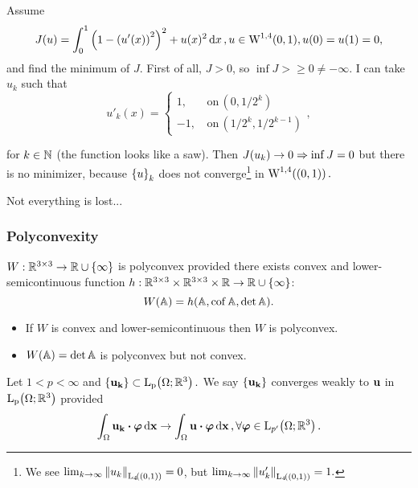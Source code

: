 \documentclass[11pt]{scrartcl} %
\begin{document}
\begin{example}
Assume
\[
	J(u) = \int_{0}^1 \qty(1-\qty(u'(x))^{2})^{2}+u(x)^{2}\dd{x}, u \in \text{W}^{1,4}(0,1), u(0) = u(1) = 0,
\]
and find the minimum of $J$. First of all, $J>0$, so $\inf J > \geq 0 \neq - \infty.$  I can take $u_k$ such that
\[
	u'_k(x) = \begin{cases} 1 , &\, \text{on} \,(0,1/2^k) \\
	-1,& \, \text{on} \, (1/2^k,1/2^{k-1})\end{cases},
\]

for $k \in {\mathbb N}$ (the function looks like a saw). Then $J\qty(u_k)\to 0 \Rightarrow \inf J = 0$ but there is no minimizer, because $\qty{u}_k$ does not converge\footnote{We see $\lim_{k \to \infty}\norm{u_k}_{\LpSet[4]{(0,1)}} = 0$, but $\lim_{k \to \infty} \norm{u'_k}_{\LpSet[4]{\qty(0,1)}} =1.$} in $\WkpSet[1][4]{\qty(0,1)}.$ 
\end{example}

Not everything is lost...

\subsubsection{Polyconvexity}
\label{sec:polyconvexity}

\begin{definition}
	$W: {\mathbb R}^{3 \times 3}\to {\mathbb R} \cup \{\infty\}$ is polyconvex provided there exists convex and lower-semicontinuous function $h: {\mathbb R}^{3 \times 3} \times {\mathbb R}^{3 \times 3} \times {\mathbb R} \to {\mathbb R} \cup \{\infty\}$:
\[
	W\qty(\mathbb{A})=h\qty(\mathbb{A}, \operatorname{cof} \mathbb{A}, \det \mathbb{A}).
\]
\end{definition}

\begin{example}
	\begin{itemize}
		\item	If $W$ is convex and lower-semicontinuous then $W$ is polyconvex. 
		\item	$W\qty(\mathbb{A}) = \det \mathbb{A}$ is polyconvex but not convex.
	\end{itemize}
\end{example}

\begin{remark}
	Let $1<p<\infty$ and $\{\vb{u_k}\} \subset \LpSet{\Omega; \R^3}.$ We say $\{\vb{u_k}\}$ converges weakly to $\vb{u}$ in $\LpSet{\Omega;\R^3}$ provided
	\[
		\int_{\Omega}\vb{u_k} \vdot \vb*{\varphi}\dd{\vb{x}} \to \int_{\Omega}\vb{u}\vdot \vb*{\varphi}\dd{\vb{x}}, \forall \vb*{\varphi} \in \LpSet[p']{\Omega;\R^3}.
	\]
\end{remark}
\end{document}
